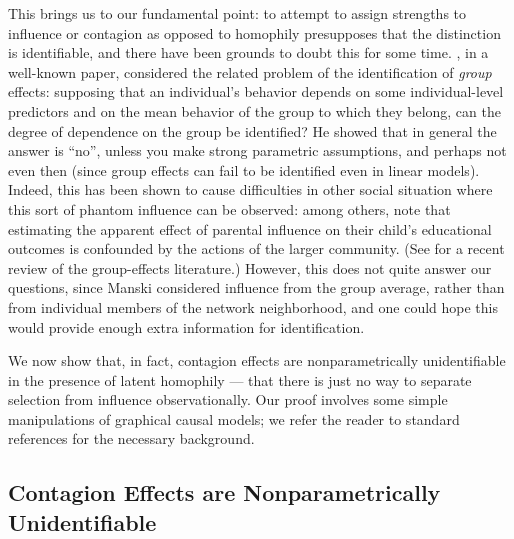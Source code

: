 \documentclass{article}
\begin{document}
\begin{multicols}{2}
This brings us to our fundamental point: to attempt to assign strengths to
influence or contagion as opposed to homophily presupposes that the distinction
is identifiable, and there have been grounds to doubt this for some time.
\citet{Manski-reflection-problem}, in a well-known paper, considered the
related problem of the identification of {\em group} effects: supposing that an
individual's behavior depends on some individual-level predictors and on the
mean behavior of the group to which they belong, can the degree of dependence
on the group be identified?  He showed that in general the answer is ``no'',
unless you make strong parametric assumptions, and perhaps not even then (since
group effects can fail to be identified even in linear models). Indeed, this
has been shown to cause difficulties in other social situation where this sort
of phantom influence can be observed: among others,
\citet{Calvo-Armengol-Jackson-on-parent-child-correlation} note that estimating
the apparent effect of parental influence on their child's educational outcomes
is confounded by the actions of the larger community.  (See
\citealt{Blume-Brock-Durlauf-Ioannides-identification} for a recent review of
the group-effects literature.)  However, this does not quite answer our
questions, since Manski considered influence from the group average, rather
than from individual members of the network neighborhood, and one could hope
this would provide enough extra information for identification.

We now show that, in fact, contagion effects are nonparametrically
unidentifiable in the presence of latent homophily --- that there is just no
way to separate selection from influence observationally.  Our proof involves
some simple manipulations of graphical causal models; we refer the reader to
standard references \citep{Spirtes-Glymour-Scheines, Pearl-causality-2nd,
  Pearl-on-causal-inference, Morgan-Winship-counterfactuals} for the necessary
background.



\subsection{Contagion Effects are Nonparametrically Unidentifiable}
\label{sec:contagion-unidentifiable}


\end{multicols}
\end{document}

